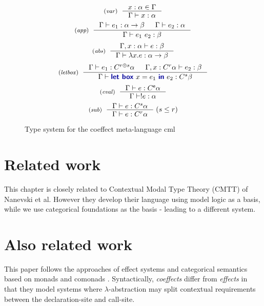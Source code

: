 \begin{figure}
\begin{equation*}
\tyrule{var}
  {x : \alpha \in \Gamma}
  {\Gamma \vdash x : \alpha }
\end{equation*}
\begin{equation*}
\tyrule{app}
  {\Gamma \vdash e_1 : \alpha \rightarrow \beta &
   \Gamma \vdash e_2 : \alpha }
  {\Gamma \vdash e_1~e_2 : \beta}
\end{equation*}
\begin{equation*}
\tyrule{abs}
  {\Gamma, x:\alpha \vdash e : \beta}
  {\Gamma \vdash \lambda x.e : \alpha \rightarrow \beta }
\end{equation*}
\begin{equation*}
\tyrule{letbox}
  {\Gamma \vdash e_1 : \ctyp{r \mseq s}{\alpha} & \Gamma, x : \ctyp{r}{\alpha} \vdash e_2 : \beta }
  {\Gamma \vdash \kvd{let~box}~x=e_1~\kvd{in}~e_2 : \ctyp{s}{\beta}}
\end{equation*}
\begin{equation*}
\tyrule{eval}
  {\Gamma \vdash e : \ctyp{\munit}{\alpha}}
  {\Gamma \vdash !e : \alpha}
\end{equation*}
\begin{equation*}
\tyrule{sub}
  {\Gamma \vdash e : \ctyp{s}{\alpha} }
  {\Gamma \vdash e : \ctyp{r}{\alpha} }
\;(s\leq r)  
\end{equation*}

\caption{Type system for the coeffect meta-language cml}
\label{fig:cml-types}
\end{figure}


\section{Related work}
This chapter is closely related to Contextual Modal Type Theory (CMTT) of Nanevski et al. However
they develop their language using model logic as a basis, while we use categorical foundations 
as the basis - leading to a different system.

\section{Also related work}

This paper follows the approaches of effect systems \cite{effects-gifford,effects-talpin-et-al,monads-effects-marriage}
and categorical semantics based on monads and comonads \cite{monad-notions,comonads-notions}. Syntactically,
\emph{coeffects} differ from \emph{effects} in that they model systems where $\lambda$-abstraction 
may split contextual requirements between the declaration-site and call-site.

